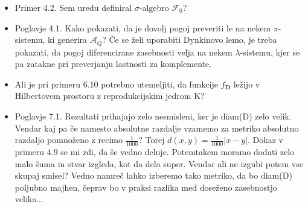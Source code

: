 \documentclass[12pt,a4paper]{amsart}
\theoremstyle{definition} %
\theoremstyle{plain} %
\begin{document}
\begin{itemize}
\item Primer 4.2. Sem uredu definiral $\sigma$-algebro $\mathcal{F}_0$?
\newline
\item Poglavje 4.1. Kako pokazati, da je dovolj pogoj preveriti le na nekem $\pi$-sistemu, ki generira $\mathcal{A}_Q$? Če se želi uporabiti Dynkinovo lemo, je treba pokazati, da pogoj diferencirane zasebnosti velja na nekem $\lambda$-sistemu, kjer se pa zatakne pri preverjanju lastnosti za komplemente.
\newline
\item Ali je pri primeru 6.10 potrebno utemeljiti, da funkcije $f_{\textbf{D}}$ ležijo v Hilbertovem prostoru z reprodukcijskim jedrom K?
\newline
\item Poglavje 7.1. Rezultati prihajajo zelo nesmisleni, ker je diam(D) zelo velik. Vendar kaj pa če namesto absolutne razdalje vzamemo za metriko absolutno razdaljo pomnoženo z recimo $\frac{1}{1000}$? Torej $d(x,y) = \frac{1}{1000} |x-y|$. Dokaz v primeru 4.9 se mi zdi, da še vedno deluje. Potemtakem moramo dodati zelo malo šuma in stvar izgleda, kot da dela super. Vendar ali ne izgubi potem vse skupaj smisel? Vedno namreč lahko izberemo tako metriko, da bo diam(D) poljubno majhen, čeprav bo v praksi razlika med doseženo zasebnostjo velika...
\newline
\end{itemize}
\end{document}
